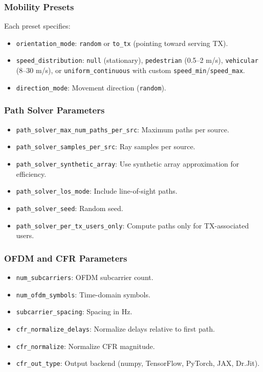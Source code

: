 \documentclass{article}
\begin{document}
\subsubsection{Mobility Presets}
Each preset specifies:
\begin{itemize}
  \item \texttt{orientation\_mode}: \texttt{random} or \texttt{to\_tx} (pointing toward serving TX).
  \item \texttt{speed\_distribution}: \texttt{null} (stationary), \texttt{pedestrian} (0.5--2 m/s), \texttt{vehicular} (8--30 m/s), or \texttt{uniform\_continuous} with custom \texttt{speed\_min}/\texttt{speed\_max}.
  \item \texttt{direction\_mode}: Movement direction (\texttt{random}).
\end{itemize}

\subsubsection{Path Solver Parameters}
\begin{itemize}
  \item \texttt{path\_solver\_max\_num\_paths\_per\_src}: Maximum paths per source.
  \item \texttt{path\_solver\_samples\_per\_src}: Ray samples per source.
  \item \texttt{path\_solver\_synthetic\_array}: Use synthetic array approximation for efficiency.
  \item \texttt{path\_solver\_los\_mode}: Include line-of-sight paths.
  \item \texttt{path\_solver\_seed}: Random seed.
  \item \texttt{path\_solver\_per\_tx\_users\_only}: Compute paths only for TX-associated users.
\end{itemize}

\subsubsection{OFDM and CFR Parameters}
\begin{itemize}
  \item \texttt{num\_subcarriers}: OFDM subcarrier count.
  \item \texttt{num\_ofdm\_symbols}: Time-domain symbols.
  \item \texttt{subcarrier\_spacing}: Spacing in Hz.
  \item \texttt{cfr\_normalize\_delays}: Normalize delays relative to first path.
  \item \texttt{cfr\_normalize}: Normalize CFR magnitude.
  \item \texttt{cfr\_out\_type}: Output backend (numpy, TensorFlow, PyTorch, JAX, Dr.Jit).
\end{itemize}
\end{document}
